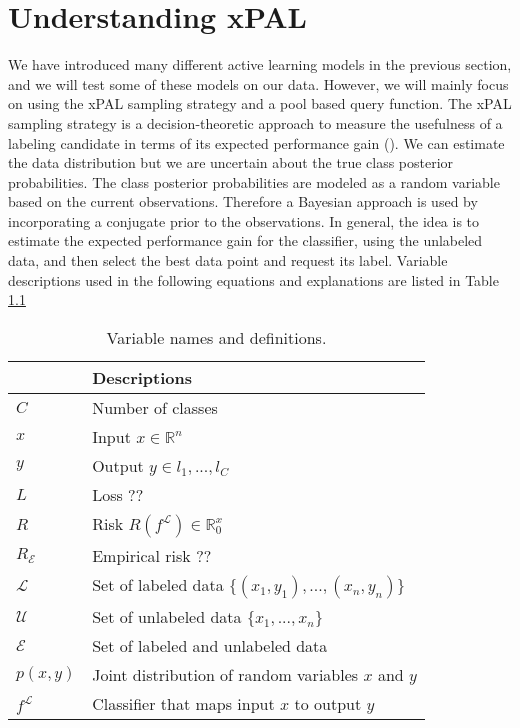 \chapter{Understanding xPAL}

We have introduced many different active learning models in the previous section, and we will test some of these models on our data. However, we will mainly focus on using the xPAL sampling strategy and a pool based query function. The xPAL sampling strategy is a decision-theoretic approach to measure the usefulness of a labeling candidate in terms of its expected performance gain (\cite{kottke2021toward}). We can estimate the data distribution but we are uncertain about the true class posterior probabilities. The class posterior probabilities are modeled as a random variable based on the current observations. Therefore a Bayesian approach is used by incorporating a conjugate prior to the observations. In general, the idea is to estimate the expected performance gain for the classifier, using the unlabeled data, and then select the best data point and request its label. Variable descriptions used in the following equations and explanations are listed in Table \ref{tab:var_defs}

\begin{table}[ht]
\centering
\begin{tabular}{|l|l|}
\hline
{} & \textbf{Descriptions} \\
\hline
$C$                         & Number of classes \\
\hline
$x$                         & Input $x \in \mathbb{R}^n$\\
\hline
$y$                         & Output $y \in l_1,...,l_C$ \\
\hline
$\textit{L}$                & Loss ??\\
\hline
$\textit{R}$                & Risk $\textit{R}(f^{\mathcal{L}}) \in \mathbb{R}_0^x$ \\
\hline
$\textit{R}_{\mathcal{E}}$  & Empirical risk ??\\
\hline
$\mathcal{L}$               & Set of labeled data $\{(x_1,y_1),...,(x_n,y_n)\}$ \\
\hline
$\mathcal{U}$               & Set of unlabeled data $\{x_1,...,x_n\}$ \\
\hline
$\mathcal{E}$               & Set of labeled and unlabeled data \\
\hline
$p(x,y)$                    & Joint distribution of random variables $x$ and $y$ \\
\hline
$f^{\mathcal{L}}$           & Classifier that maps input $x$ to output $y$ \\
\hline
\end{tabular}
\caption{Variable names and definitions.}
\label{tab:var_defs}
\end{table}

